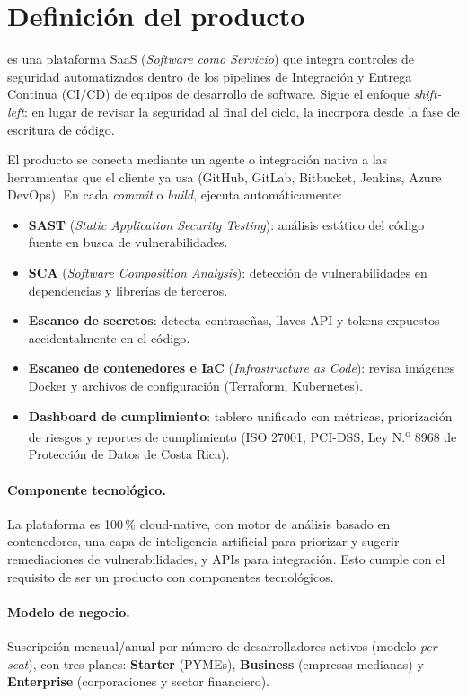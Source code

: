 \section{Definición del producto}

\textbf{\NombreProducto} es una plataforma SaaS (\emph{Software como Servicio}) que
integra controles de seguridad automatizados dentro de los pipelines de Integración
y Entrega Continua (CI/CD) de equipos de desarrollo de software. Sigue el enfoque
\emph{shift-left}: en lugar de revisar la seguridad al final del ciclo, la incorpora
desde la fase de escritura de código.

El producto se conecta mediante un agente o integración nativa a las herramientas que
el cliente ya usa (GitHub, GitLab, Bitbucket, Jenkins, Azure DevOps). En cada
\emph{commit} o \emph{build}, ejecuta automáticamente:

\begin{itemize}
  \item \textbf{SAST} (\emph{Static Application Security Testing}): análisis estático
        del código fuente en busca de vulnerabilidades.
  \item \textbf{SCA} (\emph{Software Composition Analysis}): detección de
        vulnerabilidades en dependencias y librerías de terceros.
  \item \textbf{Escaneo de secretos}: detecta contraseñas, llaves API y tokens
        expuestos accidentalmente en el código.
  \item \textbf{Escaneo de contenedores e IaC} (\emph{Infrastructure as Code}): revisa
        imágenes Docker y archivos de configuración (Terraform, Kubernetes).
  \item \textbf{Dashboard de cumplimiento}: tablero unificado con métricas,
        priorización de riesgos y reportes de cumplimiento (ISO 27001, PCI-DSS,
        Ley N.\textsuperscript{o} 8968 de Protección de Datos de Costa Rica).
\end{itemize}

\paragraph{Componente tecnológico.} La plataforma es 100\,\% cloud-native, con motor
de análisis basado en contenedores, una capa de inteligencia artificial para priorizar
y sugerir remediaciones de vulnerabilidades, y APIs para integración. Esto cumple con
el requisito de ser un producto con componentes tecnológicos.

\paragraph{Modelo de negocio.} Suscripción mensual/anual por número de desarrolladores
activos (modelo \emph{per-seat}), con tres planes: \textbf{Starter} (PYMEs),
\textbf{Business} (empresas medianas) y \textbf{Enterprise} (corporaciones y sector
financiero).
